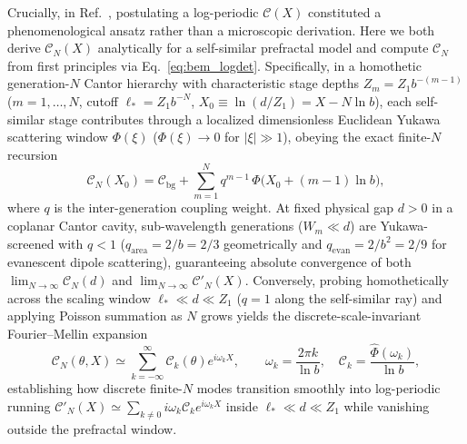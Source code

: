 \documentclass[aps,prd,twocolumn,10pt,showkeys,nofootinbib,floatfix,longbibliography]{revtex4-2}
\begin{document}
Crucially, in Ref.~\cite{gordon2026prd}, postulating a log-periodic $\mathcal{C}(X)$ constituted a phenomenological ansatz rather than a microscopic derivation. Here we both derive $\mathcal{C}_N(X)$ analytically for a self-similar prefractal model and compute $\mathcal{C}_N$ from first principles via Eq.~\eqref{eq:bem_logdet}. Specifically, in a homothetic generation-$N$ Cantor hierarchy with characteristic stage depths $Z_m = Z_1 b^{-(m-1)}$ ($m = 1,\dots,N$, cutoff $\ell_* = Z_1 b^{-N}$, $X_0 \equiv \ln(d/Z_1) = X - N\ln b$), each self-similar stage contributes through a localized dimensionless Euclidean Yukawa scattering window $\Phi(\xi)$ ($\Phi(\xi) \to 0$ for $|\xi|\gg 1$), obeying the exact finite-$N$ recursion
\begin{equation}
\mathcal{C}_N(X_0) = \mathcal{C}_{\mathrm{bg}} + \sum_{m=1}^{N} q^{m-1}\,\Phi\bigl(X_0 + (m-1)\ln b\bigr),
\label{eq:cantor_recursion_c}
\end{equation}
where $q$ is the inter-generation coupling weight. At fixed physical gap $d > 0$ in a coplanar Cantor cavity, sub-wavelength generations ($W_m \ll d$) are Yukawa-screened with $q < 1$ ($q_{\mathrm{area}} = 2/b = 2/3$ geometrically and $q_{\mathrm{evan}} = 2/b^2 = 2/9$ for evanescent dipole scattering), guaranteeing absolute convergence of both $\lim_{N\to\infty}\mathcal{C}_N(d)$ and $\lim_{N\to\infty}\mathcal{C}'_N(X)$. Conversely, probing homothetically across the scaling window $\ell_* \ll d \ll Z_1$ ($q = 1$ along the self-similar ray) and applying Poisson summation as $N$ grows yields the discrete-scale-invariant Fourier--Mellin expansion
\begin{equation}
\mathcal{C}_N(\theta, X) \simeq \sum_{k=-\infty}^{\infty} \mathcal{C}_k(\theta) e^{i \omega_k X}, \qquad \omega_k = \frac{2\pi k}{\ln b}, \quad \mathcal{C}_k = \frac{\hat{\Phi}(\omega_k)}{\ln b},
\label{eq:dsi_fourier}
\end{equation}
establishing how discrete finite-$N$ modes transition smoothly into log-periodic running $\mathcal{C}'_N(X) \simeq \sum_{k\neq 0} i\omega_k \mathcal{C}_k e^{i\omega_k X}$ inside $\ell_* \ll d \ll Z_1$ while vanishing outside the prefractal window.
\end{document}
